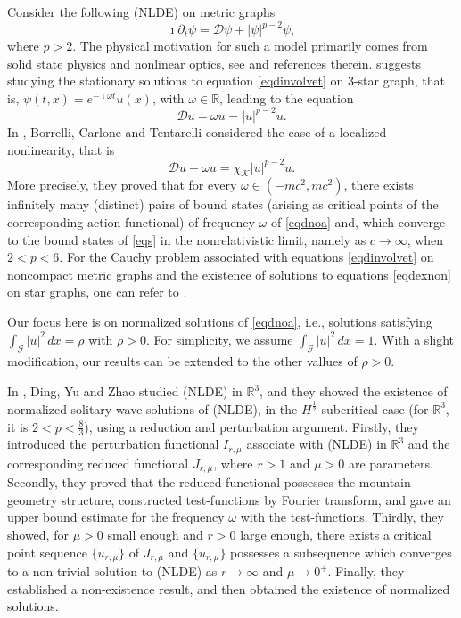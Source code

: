 \documentclass[11pt]{amsart}
\newcommand{\abs}[1]{\lvert#1\rvert}
\newcommand{\D}{\mathcal{D}}
\newcommand{\G}{\mathcal{G}}
\newcommand{\K}{\mathcal{K}}
\numberwithin{equation}{section}
\begin{document}
Consider the following (NLDE) on metric graphs
\begin{equation}\label{eqdinvolvet}
     \imath\partial_t \psi = \D\psi + \abs{\psi}^{p-2}\psi,
\end{equation}
where $p > 2$. The physical motivation for such a model primarily comes from solid state physics and nonlinear optics, see \cite{Had,Tr} and references therein.
\cite{Sa} suggests studying the stationary solutions to equation \eqref{eqdinvolvet} on $3$-star graph, that is, $\psi (t, x) = e^{- \imath\omega t} u(x)$, with $\omega  \in \mathbb{R}$, leading to the equation
\begin{equation}
\label{eqdexnon}
    \D u - \omega u= \abs{u}^{p-2}u.
\end{equation}
In \cite{Bo}, Borrelli, Carlone and Tentarelli considered the case of a localized nonlinearity, that is
\begin{equation}
\label{eqdnoa}
    \D u - \omega u= \chi_\K\abs{u}^{p-2}u.
\end{equation}
More precisely, they proved that for every $\omega \in (-mc^2,mc^2)$, there exists infinitely many (distinct) pairs of bound states (arising as critical points of the corresponding action functional) of frequency $\omega$ of \eqref{eqdnoa} and, which converge to the bound states of \eqref{eqs} in the nonrelativistic limit, namely as $c \to \infty$, when $2<p<6$. For the Cauchy problem associated with equations \eqref{eqdinvolvet} on noncompact metric graphs and the existence of solutions to equations \eqref{eqdexnon} on star graphs, one can refer to \cite{Bo1}.

Our focus here is on normalized solutions of \eqref{eqdnoa}, i.e., solutions satisfying $\int_\G\abs{u}^2\,dx = \rho$ with $\rho > 0$.  For simplicity, we assume $\int_\G\abs{u}^2\,dx = 1$. With a slight modification, our results can be extended to the other vallues of $\rho > 0$.

In \cite{Ding}, Ding, Yu and Zhao studied (NLDE) in $\mathbb{R}^3$, and they showed the existence of normalized solitary wave solutions of (NLDE), in the $H^\frac{1}{2}$-subcritical case (for $\mathbb{R}^3$, it is $2<p<\frac{8}{3}$), using a reduction and  perturbation argument.  Firstly, they introduced the perturbation functional $I_{r,\mu}$ associate with (NLDE) in $\mathbb{R}^3$ and the corresponding reduced functional $J_{r,\mu}$, where $r > 1$ and $\mu>0$ are parameters. Secondly, they proved that the reduced functional possesses the mountain geometry structure, constructed test-functions by Fourier transform, and gave an upper bound estimate for the frequency $\omega$ with the test-functions. Thirdly, they showed, for $\mu>0$ small enough and  $r>0$ large enough, there exists a critical point sequence $\{u_{r,\mu}\}$ of $J_{r,\mu}$ and $\{u_{r,\mu}\}$ possesses a subsequence which converges to a non-trivial solution to (NLDE) as $r \to \infty$ and $\mu \to 0^+$. Finally, they established a non-existence result, and then obtained the existence of normalized solutions.
\end{document}

